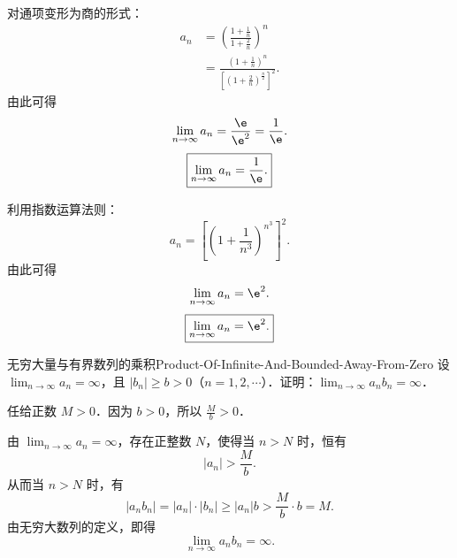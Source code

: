 \begin{solution}
    对通项变形为商的形式：
    \begin{equation}
        \begin{aligned}
            a_n & = \left( \frac{1 + \frac{1}{n}}{1 + \frac{2}{n}} \right)^n                                                \\
                & = \frac{\left( 1 + \frac{1}{n} \right)^n}{\left[ \left( 1 + \frac{2}{n} \right)^{\frac{n}{2}} \right]^2}.
        \end{aligned}
    \end{equation}
    由此可得
    \begin{equation}
        \lim_{n\to\infty} a_n = \frac{\e}{\e^2} = \frac{1}{\e}.
    \end{equation}
    \begin{equation}
        \boxed{\lim_{n\to\infty} a_n = \frac{1}{\e}.}
    \end{equation}


    利用指数运算法则：
    \begin{equation}
        a_n = \left[ \left( 1 + \frac{1}{n^3} \right)^{n^3} \right]^2.
    \end{equation}
    由此可得
    \begin{equation}
        \lim_{n\to\infty} a_n = \e^2.
    \end{equation}
    \begin{equation}
        \boxed{\lim_{n\to\infty} a_n = \e^2.}
    \end{equation}
\end{solution}

\begin{problem}{无穷大量与有界数列的乘积}{Product-Of-Infinite-And-Bounded-Away-From-Zero}
    设 $\lim_{n\to\infty} a_n = \infty$，且 $|b_n| \geqslant b > 0$（$n = 1, 2, \cdots$）．证明：$\lim_{n\to\infty} a_n b_n = \infty$．
\end{problem}

\begin{myproof}
    任给正数 $M > 0$．因为 $b > 0$，所以 $\frac{M}{b} > 0$．

    由 $\lim_{n\to\infty} a_n = \infty$，存在正整数 $N$，使得当 $n > N$ 时，恒有
    \begin{equation}
        |a_n| > \frac{M}{b}.
    \end{equation}
    从而当 $n > N$ 时，有
    \begin{equation}
        |a_n b_n| = |a_n| \cdot |b_n| \geqslant |a_n| b > \frac{M}{b} \cdot b = M.
    \end{equation}
    由无穷大数列的定义，即得
    \begin{equation}
        \lim_{n\to\infty} a_n b_n = \infty.
    \end{equation}
\end{myproof}

